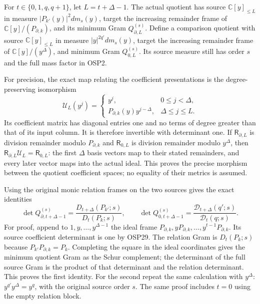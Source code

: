 \documentclass[11pt,a4paper]{article}
\begin{document}
For $t\in\{0,1,q,q+1\}$, let $L=t+\Delta-1$. The actual quotient
has source $\mathbb C[y]_{\le L}$ in measure
$|P_{k'}(y)|^2dm_s(y)$, target the increasing remainder frame of
$\mathbb C[y]/(P_{\partial,k})$, and its minimum Gram
$Q_{\partial,L}^{(s)}$. Define a comparison quotient with source
$\mathbb C[y]_{\le L}$ in measure $|y|^{2q'}dm_s(y)$, target the
increasing remainder frame of $\mathbb C[y]/(y^\Delta)$, and
minimum Gram $Q_{0,L}^{(s)}$. Its source measure still has order
$s$ and the full mass factor in OSP2.

For precision, the exact map relating the coefficient presentations
is the degree-preserving isomorphism
\[
\mathcal U_L(y^j)=
\begin{cases}
y^j,&0\le j<\Delta,\\
P_{\partial,k}(y)y^{j-\Delta},&\Delta\le j\le L.
\end{cases}\tag{OSP29}
\]
Its coefficient matrix has diagonal entries one and no terms of
degree greater than that of its input column. It is therefore
invertible with determinant one. If $\mathsf R_{\partial,L}$
is division remainder modulo $P_{\partial,k}$ and
$\mathsf R_{0,L}$ is division remainder modulo $y^\Delta$,
then
$\mathsf R_{\partial,L}\mathcal U_L=\mathsf R_{0,L}$:
the first $\Delta$ basis vectors map to their stated remainders,
and every later vector maps into the actual ideal. This proves
the precise morphism between the quotient coefficient spaces;
no equality of their metrics is assumed.

Using the original monic relation frames on the two sources gives
the exact identities
\[
\det Q_{\partial,t+\Delta-1}^{(s)}
 =\frac{D_{t+\Delta}(P_{k'};s)}{D_t(P_k;s)},\qquad
\det Q_{0,t+\Delta-1}^{(s)}
 =\frac{\mathcal D_{t+\Delta}(q';s)}{\mathcal D_t(q;s)} .
\tag{OSP30}
\]
For proof, append to $1,y,\ldots,y^{\Delta-1}$ the ideal frame
$P_{\partial,k},yP_{\partial,k},\ldots,y^{t-1}P_{\partial,k}$.
Its source coefficient determinant is one by OSP29. The relation
Gram is $D_t(P_k;s)$ because $P_{k'}P_{\partial,k}=P_k$.
Completing the square in the ideal coordinates gives the minimum
quotient Gram as the Schur complement; the determinant of the
full source Gram is the product of that determinant and the
relation determinant. This proves the first identity.
For the second repeat the same calculation with $y^\Delta$:
$y^{q'}y^\Delta=y^q$, with the original source order $s$.
The same proof includes $t=0$ using the empty relation block.
\end{document}
